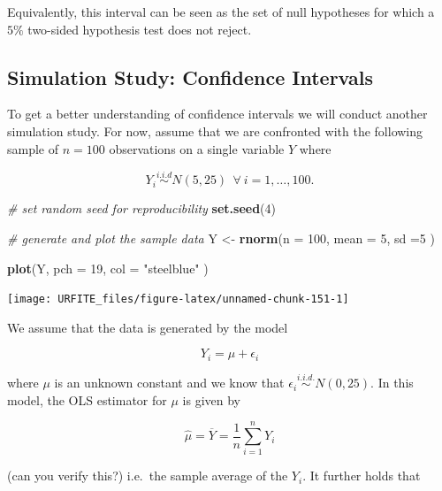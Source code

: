 \documentclass[]{book}
\newenvironment{Shaded}{\begin{snugshade}}{\end{snugshade}}
\newcommand{\KeywordTok}[1]{\textcolor[rgb]{0.13,0.29,0.53}{\textbf{#1}}}
\newcommand{\DataTypeTok}[1]{\textcolor[rgb]{0.13,0.29,0.53}{#1}}
\newcommand{\DecValTok}[1]{\textcolor[rgb]{0.00,0.00,0.81}{#1}}
\newcommand{\StringTok}[1]{\textcolor[rgb]{0.31,0.60,0.02}{#1}}
\newcommand{\CommentTok}[1]{\textcolor[rgb]{0.56,0.35,0.01}{\textit{#1}}}
\newcommand{\NormalTok}[1]{#1}
\theoremstyle{definition}
\theoremstyle{definition}
\theoremstyle{definition}
\theoremstyle{remark}
\begin{document}
Equivalently, this interval can be seen as the set of null hypotheses
for which a \(5\%\) two-sided hypothesis test does not reject.

\subsection*{Simulation Study: Confidence
Intervals}\label{simulation-study-confidence-intervals}

To get a better understanding of confidence intervals we will conduct
another simulation study. For now, assume that we are confronted with
the following sample of \(n=100\) observations on a single variable
\(Y\) where

\[ Y_i \overset{i.i.d}{\sim} N(5,25) \ \ \forall \ i = 1, \dots, 100.\]

\begin{Shaded}
\begin{Highlighting}[]
\CommentTok{# set random seed for reproducibility}
\KeywordTok{set.seed}\NormalTok{(}\DecValTok{4}\NormalTok{)}

\CommentTok{# generate and plot the sample data}
\NormalTok{Y <-}\StringTok{ }\KeywordTok{rnorm}\NormalTok{(}\DataTypeTok{n =} \DecValTok{100}\NormalTok{, }
           \DataTypeTok{mean =} \DecValTok{5}\NormalTok{, }
           \DataTypeTok{sd =}\DecValTok{5}
\NormalTok{           )}

\KeywordTok{plot}\NormalTok{(Y, }
     \DataTypeTok{pch =} \DecValTok{19}\NormalTok{, }
     \DataTypeTok{col =} \StringTok{"steelblue"}
\NormalTok{     )}
\end{Highlighting}
\end{Shaded}

\begin{center}\texttt{[image: URFITE\_files/figure-latex/unnamed-chunk-151-1]} \end{center}

We assume that the data is generated by the model

\[ Y_i = \mu + \epsilon_i \]

where \(\mu\) is an unknown constant and we know that
\(\epsilon_i \overset{i.i.d.}{\sim} N(0,25)\). In this model, the OLS
estimator for \(\mu\) is given by

\[ \hat\mu = \overline{Y} = \frac{1}{n} \sum_{i=1}^n Y_i \]

(can you verify this?) i.e.~the sample average of the \(Y_i\). It
further holds that
\end{document}
